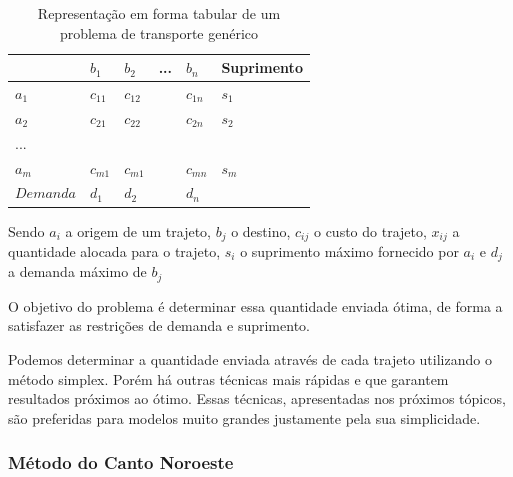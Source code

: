 \documentclass [11pt]{articleSBPO}
\begin{document}
\begin{table}[]
	\centering
	\caption[]{Representação em forma tabular de um problema de transporte genérico}
	\label{fig:tabelatransporte}
	\begin{tabular}{ l | l  l  l  l | l }
				& $b_{1}$ 	& $b_{2}$ 	& ... & $b_{n}$  & Suprimento\\
				\hline
	$a_{1}$		& $c_{11}$ 	& $c_{12}$	&  	  & $c_{1n}$ & $s_{1}$\\
	$a_{2}$		& $c_{21}$ 	& $c_{22}$	&  	  & $c_{2n}$ & $s_{2}$\\
	...			&  &  &  &  & \\
	$a_{m}$		& $c_{m1}$ 	& $c_{m1}$	&  	  & $c_{mn}$ & $s_{m}$\\
				\hline
	$Demanda$	& $d_{1}$ 	& $d_{2}$ 	& 	  & $d_{n}$	 & \\
	\end{tabular}
\end{table}

Sendo $a_{i}$ a origem de um trajeto, $b_{j}$ o destino, $c_{ij}$ o custo do trajeto, $x_{ij}$ a quantidade alocada para o trajeto, $s_{i}$ o suprimento máximo fornecido por $a_{i}$ e $d_{j}$ a demanda máximo de $b_{j}$

O objetivo do problema é determinar essa quantidade enviada ótima, de forma a satisfazer as restrições de demanda e suprimento.

Podemos determinar a quantidade enviada através de cada trajeto utilizando o método simplex. Porém há outras técnicas mais rápidas e que garantem resultados próximos ao ótimo. Essas técnicas, apresentadas nos próximos tópicos, são preferidas para modelos muito grandes justamente pela sua simplicidade.

%
%

\subsubsection{Método do Canto Noroeste}\label{subsubsec:noroeste}
\end{document}
